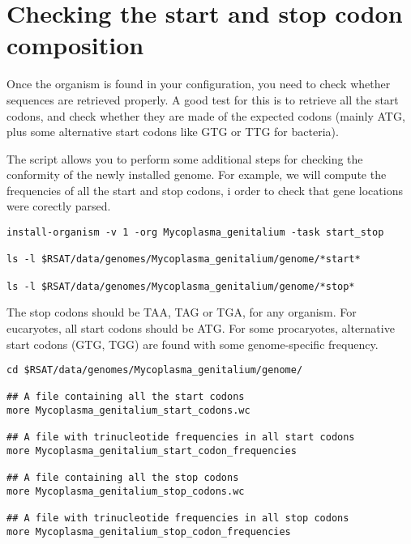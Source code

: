 \section{Checking the start and stop codon composition}

Once the organism is found in your configuration, you need to check
whether sequences are retrieved properly. A good test for this is to
retrieve all the start codons, and check whether they are made of the
expected codons (mainly ATG, plus some alternative start codons like
GTG or TTG for bacteria).

The script  allows you to perform some
additional steps for checking the conformity of the newly installed
genome. For example, we will compute the frequencies of all the start
and stop codons, i order to check that gene locations were corectly
parsed.

\begin{footnotesize}
\begin{verbatim}
install-organism -v 1 -org Mycoplasma_genitalium -task start_stop

ls -l $RSAT/data/genomes/Mycoplasma_genitalium/genome/*start*

ls -l $RSAT/data/genomes/Mycoplasma_genitalium/genome/*stop*
\end{verbatim}
\end{footnotesize}


The stop codons should be TAA, TAG or TGA, for any organism. For
eucaryotes, all start codons should be ATG. For some procaryotes,
alternative start codons (GTG, TGG) are found with some
genome-specific frequency.

\begin{footnotesize}
\begin{verbatim}
cd $RSAT/data/genomes/Mycoplasma_genitalium/genome/

## A file containing all the start codons
more Mycoplasma_genitalium_start_codons.wc

## A file with trinucleotide frequencies in all start codons
more Mycoplasma_genitalium_start_codon_frequencies

## A file containing all the stop codons
more Mycoplasma_genitalium_stop_codons.wc

## A file with trinucleotide frequencies in all stop codons
more Mycoplasma_genitalium_stop_codon_frequencies
\end{verbatim}
\end{footnotesize}


